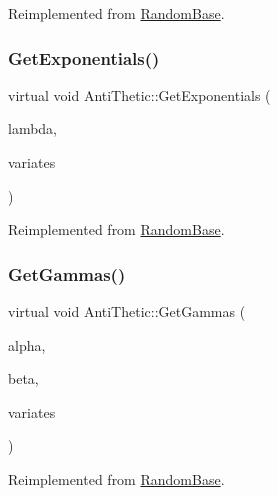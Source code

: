 Reimplemented from \hyperlink{classRandomBase_aa3f3efa1333ab5d7689b8cc7ebd26622}{Random\+Base}.

\hypertarget{classAntiThetic_aa4ee18288564b74c7a2d7e5015e87d6c}{}\label{classAntiThetic_aa4ee18288564b74c7a2d7e5015e87d6c} 
\subsubsection{\texorpdfstring{Get\+Exponentials()}{GetExponentials()}}
{\footnotesize\ttfamily virtual void Anti\+Thetic\+::\+Get\+Exponentials (\begin{DoxyParamCaption}\item[{double}]{lambda,  }\item[{\hyperlink{classMJArray}{M\+J\+Array} \&}]{variates }\end{DoxyParamCaption})\hspace{0.3cm}{\ttfamily [virtual]}}



Reimplemented from \hyperlink{classRandomBase_ad1d2c39a8440f67cffda3ad41a4f9975}{Random\+Base}.

\hypertarget{classAntiThetic_a367486230368c4624cabf6172b97dafe}{}\label{classAntiThetic_a367486230368c4624cabf6172b97dafe} 
\subsubsection{\texorpdfstring{Get\+Gammas()}{GetGammas()}}
{\footnotesize\ttfamily virtual void Anti\+Thetic\+::\+Get\+Gammas (\begin{DoxyParamCaption}\item[{double}]{alpha,  }\item[{double}]{beta,  }\item[{\hyperlink{classMJArray}{M\+J\+Array} \&}]{variates }\end{DoxyParamCaption})\hspace{0.3cm}{\ttfamily [virtual]}}



Reimplemented from \hyperlink{classRandomBase_a5b5c89afe295ba49a5474cdc3bf80c3d}{Random\+Base}.

\hypertarget{classAntiThetic_ac680e938752f4d5b2a5ba51f5d4862e2}{}\label{classAntiThetic_ac680e938752f4d5b2a5ba51f5d4862e2} 
